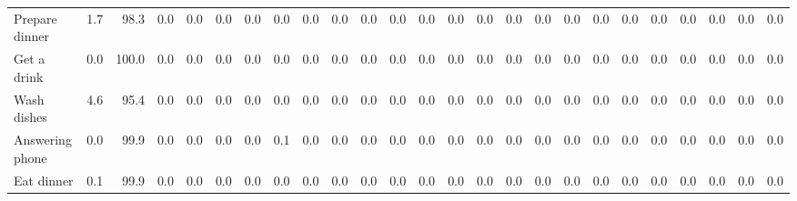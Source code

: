 \documentclass{article}
\begin{document}
\begin{sideways}
\begin{tabular}{lrrrrrrrrrrrrrrrrrrrrrrrr}
Prepare dinner          &         1.7 &                     98.3 &               0.0 &                0.0 &                0.0 &            0.0 &              0.0 &                0.0 &                   0.0 &                   0.0 &                0.0 &                0.0 &                    0.0 &               0.0 &               0.0 &              0.0 &                   0.0 &             0.0 &                          0.0 &                 0.0 &               0.0 &                        0.0 &                        0.0 &                            0.0 \\
Get a drink             &         0.0 &                    100.0 &               0.0 &                0.0 &                0.0 &            0.0 &              0.0 &                0.0 &                   0.0 &                   0.0 &                0.0 &                0.0 &                    0.0 &               0.0 &               0.0 &              0.0 &                   0.0 &             0.0 &                          0.0 &                 0.0 &               0.0 &                        0.0 &                        0.0 &                            0.0 \\
Wash dishes             &         4.6 &                     95.4 &               0.0 &                0.0 &                0.0 &            0.0 &              0.0 &                0.0 &                   0.0 &                   0.0 &                0.0 &                0.0 &                    0.0 &               0.0 &               0.0 &              0.0 &                   0.0 &             0.0 &                          0.0 &                 0.0 &               0.0 &                        0.0 &                        0.0 &                            0.0 \\
Answering phone         &         0.0 &                     99.9 &               0.0 &                0.0 &                0.0 &            0.0 &              0.1 &                0.0 &                   0.0 &                   0.0 &                0.0 &                0.0 &                    0.0 &               0.0 &               0.0 &              0.0 &                   0.0 &             0.0 &                          0.0 &                 0.0 &               0.0 &                        0.0 &                        0.0 &                            0.0 \\
Eat dinner              &         0.1 &                     99.9 &               0.0 &                0.0 &                0.0 &            0.0 &              0.0 &                0.0 &                   0.0 &                   0.0 &                0.0 &                0.0 &                    0.0 &               0.0 &               0.0 &              0.0 &                   0.0 &             0.0 &                          0.0 &                 0.0 &               0.0 &                        0.0 &                        0.0 &                            0.0 \\

\end{tabular}
\end{sideways}
\end{document}
